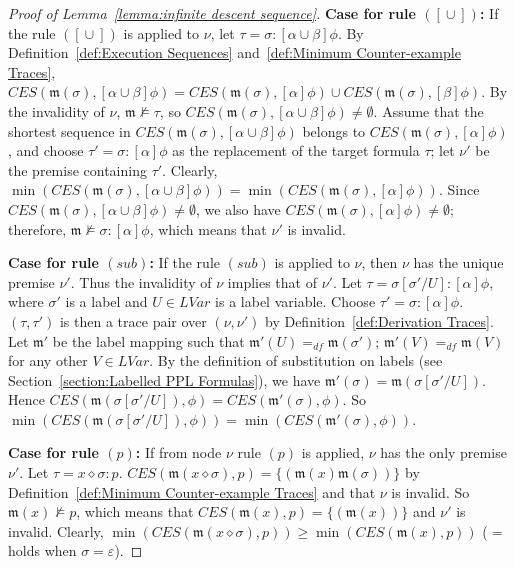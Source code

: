 \documentclass[manuscript,screen]{acmart}
\newcommand{\mfr}[1]{\mathfrak{#1}}
\newcommand{\dddef}[0]{=_{df}}
\DeclareMathOperator{\cho}{\cup}
\newcommand{\Sub}[0]{{\textit{sub}}}
\newcommand{\lm}[0]{\mfr{m}}
\newcommand{\EX}[0]{\textit{CES}}
\newcommand{\cat}[0]{\diamond}
\newcommand{\LVar}[0]{\mathit{LVar}}
\begin{document}
\begin{proof}[Proof of Lemma~\ref{lemma:infinite descent sequence}]
    \textbf{Case for rule $([\cho])$: }
If the rule $([\cho])$ is applied to $\nu$, let $\tau = \sigma : [\alpha\cho\beta]\phi$. 
    By Definition~\ref{def:Execution Sequences} and~\ref{def:Minimum Counter-example Traces}, $\EX(\lm(\sigma), [\alpha\cho\beta]\phi)=\EX(\lm(\sigma), [\alpha]\phi)\cup\EX(\lm(\sigma),[\beta]\phi)$. 
    By the invalidity of $\nu$, $\lm\not\models \tau$, so $\EX(\lm(\sigma), [\alpha\cho\beta]\phi)\neq\emptyset$. 
Assume that the shortest sequence in $\EX(\lm(\sigma), [\alpha\cho\beta]\phi)$ belongs to $\EX(\lm(\sigma), [\alpha]\phi)$, and choose $\tau' = \sigma : [\alpha]\phi$ as the replacement of the target formula $\tau$; let $\nu'$ be the premise containing $\tau'$. Clearly, $\min(\EX(\lm(\sigma), [\alpha\cho\beta]\phi)) = \min(\EX(\lm(\sigma), [\alpha]\phi))$. 
Since $\EX(\lm(\sigma), [\alpha\cho\beta]\phi)\neq\emptyset$, we also have $\EX(\lm(\sigma), [\alpha]\phi)\neq\emptyset$; therefore, $\lm\not\models \sigma : [\alpha]\phi$, which means that $\nu'$ is invalid. 

    \textbf{Case for rule $(\Sub)$: }
If the rule $(\Sub)$ is applied to $\nu$, then $\nu$ has the unique premise $\nu'$. 
    Thus the invalidity of $\nu$ implies that of $\nu'$. 
Let $\tau = \sigma[\sigma'/U] : [\alpha]\phi$, where $\sigma'$ is a label and $U\in \LVar$ is a label variable. Choose $\tau' = \sigma : [\alpha]\phi$. 
    $(\tau, \tau')$ is then a trace pair over $(\nu, \nu')$ by Definition~\ref{def:Derivation Traces}. 
    Let $\lm'$ be the label mapping such that $\lm'(U)\dddef \lm(\sigma')$; $\lm'(V)\dddef \lm(V)$ for any other $V\in \LVar$. 
    By the definition of substitution on labels (see Section~\ref{section:Labelled PPL Formulas}), 
    we have $\lm'(\sigma)=\lm(\sigma[\sigma'/U])$. 
    Hence $\EX(\lm(\sigma[\sigma'/U]), \phi) = \EX(\lm'(\sigma), \phi)$. 
    So $\min(\EX(\lm(\sigma[\sigma'/U]), \phi)) = \min(\EX(\lm'(\sigma), \phi))$. 
    
    \ifx
    \textbf{Case for rule $(p)$: }
    If from node $\nu$ rule $(p)$ is applied, $\nu$ has the only premise $\nu'$. 
    Let $\tau = x\cat \sigma : p$. 
    $\EX(\lm(x\cat \sigma), p) = \{(\lm(x)\lm(\sigma))\}$ by Definition~\ref{def:Minimum Counter-example Traces} and that $\nu$ is invalid.
    So $\lm(x)\not\models p$, which means that $\EX(\lm(x), p) = \{(\lm(x))\}$ and $\nu'$ is invalid. 
    Clearly, $\min(\EX(\lm(x\cat \sigma), p)) \ge \min(\EX(\lm(x), p))$ ($=$ holds when $\sigma = \varepsilon$). 
    \fi



\end{proof}
\end{document}
